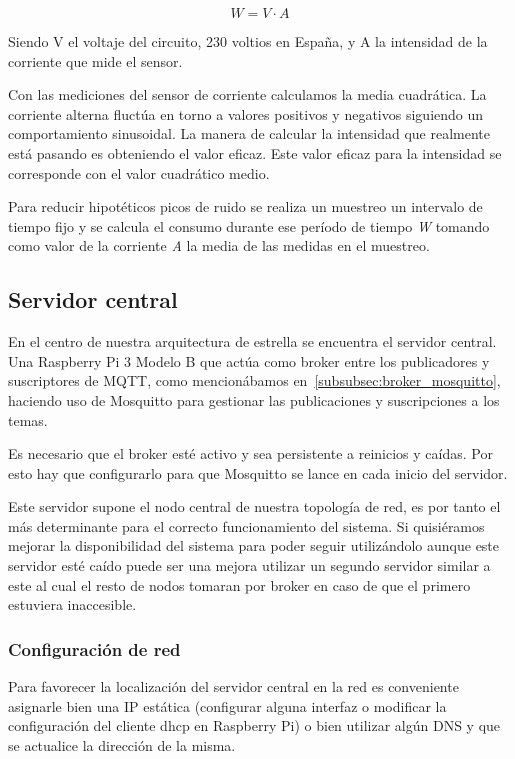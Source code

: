 \documentclass[a4paper,10pt]{article}
\begin{document}
\[W = V\cdot A\]

Siendo V el voltaje del circuito, 230 voltios en España, y A la
intensidad de la corriente que mide el sensor.

Con las mediciones del sensor de corriente calculamos la
media cuadrática. La corriente alterna fluctúa en torno a valores
positivos y negativos siguiendo un comportamiento sinusoidal. La
manera de calcular la intensidad que realmente está pasando es
obteniendo el valor eficaz. Este valor eficaz para la intensidad se
corresponde con el valor cuadrático
medio\cite{alcaldesanmiguelElectrotecniaInstalacionesElectricas2014}.

Para reducir hipotéticos picos de ruido se realiza un muestreo un
intervalo de tiempo fijo y se calcula el consumo durante ese período
de tiempo \textit{W} tomando como valor de la corriente \textit{A} la
media de las medidas en el muestreo.

\newpage

\subsection{Servidor central}\label{subsec:servidor-central}

En el centro de nuestra arquitectura de estrella se encuentra el
servidor central. Una Raspberry Pi 3 Modelo B que actúa como broker
entre los publicadores y suscriptores de MQTT, como mencionábamos
en~\ref{subsubsec:broker_mosquitto}, haciendo uso de Mosquitto para
gestionar las publicaciones y suscripciones a los temas.

Es necesario que el broker esté activo y sea persistente a reinicios y
caídas. Por esto hay que configurarlo para que Mosquitto se lance en
cada inicio del servidor.

Este servidor supone el nodo central de nuestra topología de red, es
por tanto el más determinante para el correcto funcionamiento del
sistema. Si quisiéramos mejorar la disponibilidad del sistema para
poder seguir utilizándolo aunque este servidor esté caído puede ser
una mejora utilizar un segundo servidor similar a este al cual el
resto de nodos tomaran por broker en caso de que el primero estuviera
inaccesible.

\subsubsection{Configuración de red}

Para favorecer la localización del servidor central en la red es
conveniente asignarle bien una IP estática (configurar alguna interfaz
o modificar la configuración del cliente dhcp en Raspberry Pi) o bien
utilizar algún DNS y que se actualice la dirección de la misma.
\end{document}
